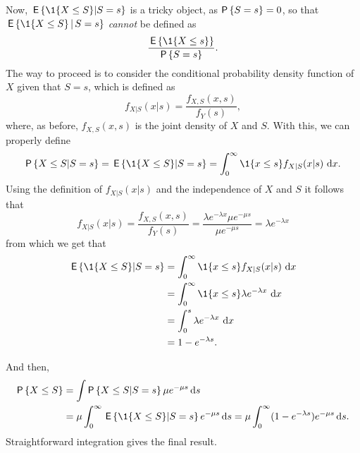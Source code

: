 \begin{exercise}
\begin{solution}
Now, $\E{\1{X\leq S}| S=s}$ is a tricky object, as $\P{S=s} = 0$, so that 
$\E{\1{X\leq S}\given S=s}$ \emph{cannot} be defined as 
\begin{equation*}
\frac{\E{\1{X\leq s}}}{\P{S=s}}.
\end{equation*}
The way to proceed is to consider the conditional probability density function of $X$ given that $S=s$, which is defined as
\begin{equation*}
  f_{X|S}(x|s) = \frac{f_{X, S}( x, s)}{f_Y(s)},
\end{equation*}
where, as before, $f_{X, S}( x, s)$ is the joint density of $X$ and $S$. With this, we can properly define
\begin{equation*}
  \begin{split}
  \P{X\leq S| S=s } = \E{\1{X \leq S}| S=s } = \int_0^\infty \1{x \leq s}   f_{X|S}(x|s)\, \d x.
  \end{split}
\end{equation*}
Using the definition of $f_{X|S}(x|s)$ and the independence of $X$ and $S$ it follows that
\begin{equation*}
  f_{X|S}(x|s) = \frac{f_{X, S}( x, s)}{f_Y(s)} = \frac{\lambda e^{-\lambda x} \mu e^{-\mu s}}{\mu e^{-\mu s}} = \lambda e^{-\lambda x}
\end{equation*}
from which we get that 
\begin{equation*}
  \begin{split}
  \E{\1{X \leq S}| S=s } 
&= \int_0^\infty \1{x \leq s}   f_{X|S}(x|s)\, \d x \\
&= \int_0^\infty \1{x \leq s} \lambda e^{-\lambda x}\, \d x \\
&= \int_0^s \lambda e^{-\lambda x}\, \d x \\
&= 1 - e^{-\lambda s}.
  \end{split}
\end{equation*}

And then,  
\begin{equation*}
  \begin{split}
  \P{X\leq S} &= \int \P{X\leq S| S=s} \mu e^{-\mu s}\d s \\
&= \mu \int_0^\infty \E{\1{X \leq S}| S=s } e^{-\mu s} \d s= \mu \int_0^\infty (1 - e^{-\lambda s})e^{-\mu s} \d s.
  \end{split}
\end{equation*}
Straightforward integration gives the final result.
\end{solution}
\end{exercise}

